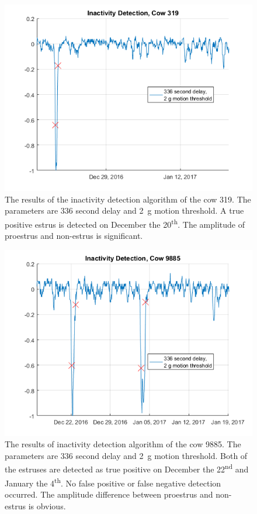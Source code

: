 \begin{figure}[h]
\centering
\includegraphics[width = 0.75 \textwidth]{figures/InactivityDetectionCow319.png}
\caption{The results of the inactivity detection algorithm of the cow 319. The parameters are 336 second delay and \SI{2}{\gram} motion threshold. A true positive estrus is detected on December the 20\textsuperscript{th}. The amplitude of proestrus and non-estrus is significant. }
\label{InactivityDetectionCow319}
\end{figure}


\begin{figure}[h]
\centering
\includegraphics[width = 0.75 \textwidth]{figures/InactivityDetectionCow9885.png}
\caption{The results of inactivity detection algorithm of the cow 9885. The parameters are 336 second delay and \SI{2}{\gram} motion threshold. Both of the estruses are detected as true positive on December the 22\textsuperscript{nd} and January the 4\textsuperscript{th}. No false positive or false negative detection occurred. The amplitude difference between proestrus and non-estrus is obvious.}
\label{InactivityDetectionCow9885}
\end{figure}


